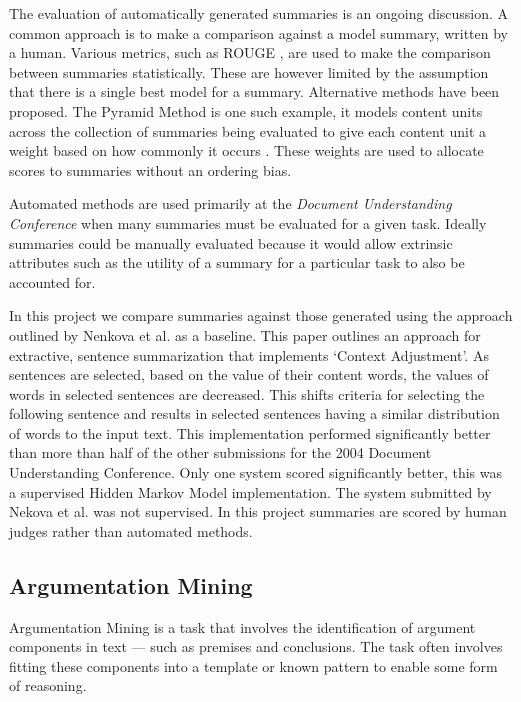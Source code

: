         The evaluation of automatically generated summaries is an ongoing discussion. A common approach is to make a comparison against a model summary, written by a human. Various metrics, such as ROUGE \cite{lin2004rouge}, are used to make the comparison between summaries statistically. These are however limited by the assumption that there is a single best model for a summary. Alternative methods have been proposed. The Pyramid Method is one such example, it models content units across the collection of summaries being evaluated to give each content unit a weight based on how commonly it occurs \cite{nenkova2004evaluating}. These weights are used to allocate scores to summaries without an ordering bias.

        Automated methods are used primarily at the \textit{Document Understanding Conference} when many summaries must be evaluated for a given task. Ideally summaries could be manually evaluated because it would allow extrinsic attributes such as the utility of a summary for a particular task to also be accounted for.

        In this project we compare summaries against those generated using the approach outlined by Nenkova et al. \cite{nenkova2006compositional} as a baseline. This paper outlines an approach for extractive, sentence summarization that implements `Context Adjustment'. As sentences are selected, based on the value of their content words, the values of words in selected sentences are decreased. This shifts criteria for selecting the following sentence and results in selected sentences having a similar distribution of words to the input text. This implementation performed significantly better than more than half of the other submissions for the 2004 Document Understanding Conference. Only one system scored significantly better, this was a supervised Hidden Markov Model implementation. The system submitted by Nekova et al. was not supervised. In this project summaries are scored by human judges rather than automated methods.

    \tocless\subsection{Argumentation Mining}
      Argumentation Mining is a task that involves the identification of argument components in text --- such as premises and conclusions. The task often involves fitting these components into a template or known pattern to enable some form of reasoning. \cite{palau2009argumentation}

